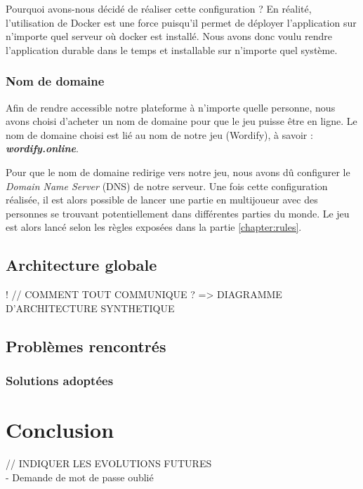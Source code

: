 \documentclass{tnreport}
\begin{document}
Pourquoi avons-nous décidé de réaliser cette configuration ? En réalité, l'utilisation de Docker est une force puisqu'il permet de déployer l'application sur n'importe quel serveur où docker est installé. Nous avons donc voulu rendre l'application durable dans le temps et installable sur n'importe quel système.

\subsection{Nom de domaine}

Afin de rendre accessible notre plateforme à n'importe quelle personne, nous avons choisi d'acheter un nom de domaine pour que le jeu puisse être en ligne. Le nom de domaine choisi est lié au nom de notre jeu (Wordify), à savoir : \textbf{\textit{wordify.online}}.

Pour que le nom de domaine redirige vers notre jeu, nous avons dû configurer le \textit{Domain Name Server} (DNS) de notre serveur. Une fois cette configuration réalisée, il est alors possible de lancer une partie en multijoueur avec des personnes se trouvant potentiellement dans différentes parties du monde. Le jeu est alors lancé selon les règles exposées dans la partie \ref{chapter:rules}. 

\section{Architecture globale}
!
// COMMENT TOUT COMMUNIQUE ? => DIAGRAMME D'ARCHITECTURE SYNTHETIQUE

\section{Problèmes rencontrés}

\subsection{Solutions adoptées}

\cleardoublepage

\chapter{Conclusion}

// INDIQUER LES EVOLUTIONS FUTURES \\
 - Demande de mot de passe oublié

\cleardoublepage

\listoffigures
\end{document}
